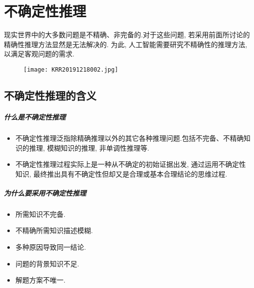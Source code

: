 \chapter{不确定性推理}
\begin{tcolorbox}[colback=white!50,colframe=orange!50,title=不精确性推理方法]
\begin{center}
现实世界中的大多数问题是不精确、非完备的.对于这些问题, 若采用前面所讨论的精确性推理方法显然是无法解决的.
为此, 人工智能需要研究不精确性的推理方法, 以满足客观问题的需求.
\hfill
\end{center}
\end{tcolorbox}
\begin{figure}[H]
\centering
\texttt{[image: KRR20191218002.jpg]}
\label{KRR20191218002}
\end{figure}
\section{不确定性推理的含义}
\paragraph{什么是不确定性推理}
\begin{itemize}
\item 不确定性推理泛指除精确推理以外的其它各种推理问题.包括不完备、不精确知识的推理, 模糊知识的推理, 非单调性推理等.
\item 不确定性推理过程实际上是一种从不确定的初始证据出发, 通过运用不确定性知识, 最终推出具有不确定性但却又是合理或基本合理结论的思维过程.
\end{itemize}
\paragraph{为什么要采用不确定性推理}
\begin{itemize}
\item  所需知识不完备.
\item  不精确所需知识描述模糊.
\item  多种原因导致同一结论.
\item  问题的背景知识不足.
\item  解题方案不唯一.
\end{itemize}
